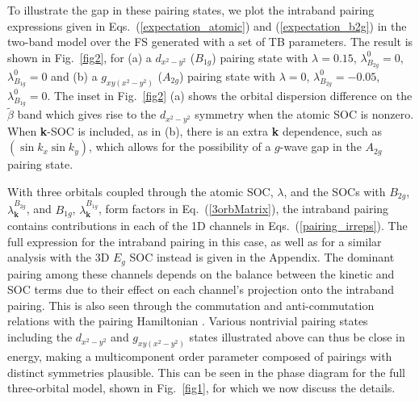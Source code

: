 \documentclass[%
reprint,
superscriptaddress,
 amsmath,amssymb,
 aps,
prb,
nobalancelastpage,
]{revtex4-2}
\begin{document}



To illustrate the gap in these pairing states, we plot the intraband pairing expressions given in  Eqs.~(\ref{expectation_atomic}) and (\ref{expectation_b2g}) in the two-band model over the FS generated with a set of TB parameters. The result is shown in Fig.~\ref{fig2}, for (a) a $d_{x^2-y^2}$ ($B_{1g}$) pairing state with $\lambda=0.15$, $\lambda_{B_{2g}}^{0}=0$, $\lambda_{B_{1g}}^{0}=0$ and (b) a $g_{xy(x^2-y^2)}$ ($A_{2g}$) pairing state with $\lambda=0$, $\lambda_{B_{2g}}^{0}=-0.05$, $\lambda_{B_{1g}}^{0}=0$. The inset in Fig.~\ref{fig2} (a) shows the orbital dispersion difference on the $\widetilde{\beta}$ band which gives rise to the $d_{x^2-y^2}$ symmetry when the atomic SOC is nonzero. When \textbf{k}-SOC is included, as in (b), there is an extra \textbf{k} dependence, such as $(\sin{k_x}\sin{k_y})$, which allows for the possibility of a $g$-wave gap in the $A_{2g}$ pairing state.




With three orbitals coupled through the atomic SOC, $\lambda$, and the SOCs with $B_{2g}$, $\lambda_{\textbf{k}}^{B_{2g}}$, and $B_{1g}$, $\lambda_{\textbf{k}}^{B_{1g}}$, form factors in Eq.~(\ref{3orbMatrix}), the intraband pairing contains contributions in each of the 1D channels in Eqs.~(\ref{pairing_irreps}). The full expression for the intraband pairing in this case, as well as for a similar analysis with the 3D $E_{g}$ SOC instead is given in the Appendix. The dominant pairing among these channels depends on the balance between the kinetic and SOC terms due to their effect on each channel's projection onto the intraband pairing. This is also seen through the commutation and anti-commutation relations with the pairing Hamiltonian \cite{fischer2013NJP, Ramires2016PRB, Ramires2018PRB}. Various nontrivial pairing states including the $d_{x^2-y^2}$ and $g_{xy(x^2-y^2)}$ states illustrated above can thus be close in energy, making a multicomponent order parameter composed of pairings with distinct symmetries plausible. This can be seen in the phase diagram for the full three-orbital model, shown in Fig.~\ref{fig1}, for which we now discuss the details.
\end{document}
